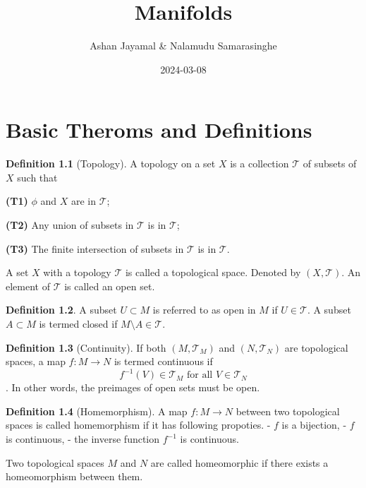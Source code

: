 \documentclass[
]{book}
\title{Manifolds}
\author{Ashan Jayamal \& Nalamudu Samarasinghe}
\date{2024-03-08}
\theoremstyle{definition}
\newtheorem{definition}{Definition}[chapter]
\theoremstyle{definition}
\theoremstyle{definition}
\theoremstyle{definition}
\theoremstyle{remark}
\begin{document}
\maketitle

{
\setcounter{tocdepth}{1}
\tableofcontents
}
\hypertarget{basic-theroms-and-definitions}{%
\chapter{Basic Theroms and Definitions}\label{basic-theroms-and-definitions}}

\begin{definition}[Topology]
\protect\hypertarget{def:Top}{}\label{def:Top}A topology on a set \(X\) is a collection \(\mathcal{T}\) of subsets of \(X\) such that

\textbf{(T1)} \(\phi\) and \(X\) are in \(\mathcal{T}\);

\textbf{(T2)} Any union of subsets in \(\mathcal{T}\) is in \(\mathcal{T}\);

\textbf{(T3)} The finite intersection of subsets in \(\mathcal{T}\) is in \(\mathcal{T}\).
\end{definition}

A set \(X\) with a topology \(\mathcal{T}\) is called a topological space. Denoted by \((X,\mathcal{T})\). An element of \(\mathcal{T}\) is called an open set.

\begin{definition}
\protect\hypertarget{def:unnamed-chunk-1}{}\label{def:unnamed-chunk-1}A subset \(U \subset M\) is referred to as open in \(M\) if \(U \in \mathcal{T}\). A subset \(A \subset M\) is termed closed if \(M \setminus A \in \mathcal{T}\).
\end{definition}

\begin{definition}[Continuity]
\protect\hypertarget{def:unnamed-chunk-2}{}\label{def:unnamed-chunk-2}If both \((M, \mathcal{T}_M)\) and \((N, \mathcal{T}_N)\) are topological spaces, a map \(f : M \rightarrow N\) is termed continuous if \[f^{-1}(V) \in \mathcal{T}_M \text{ for all } V \in \mathcal{T}_N\].
In other words, the preimages of open sets must be open.
\end{definition}

\begin{definition}[Homemorphism]
\protect\hypertarget{def:unnamed-chunk-3}{}\label{def:unnamed-chunk-3}A map \(f : M \rightarrow N\) between two topological spaces is called homemorphism if it has following propoties.
- \(f\) is a bijection,
- \(f\) is continuous,
- the inverse function \(f^{-1}\) is continuous.

Two topological spaces \(M\) and \(N\) are called homeomorphic if there exists a homeomorphism between them.
\end{definition}
\end{document}
